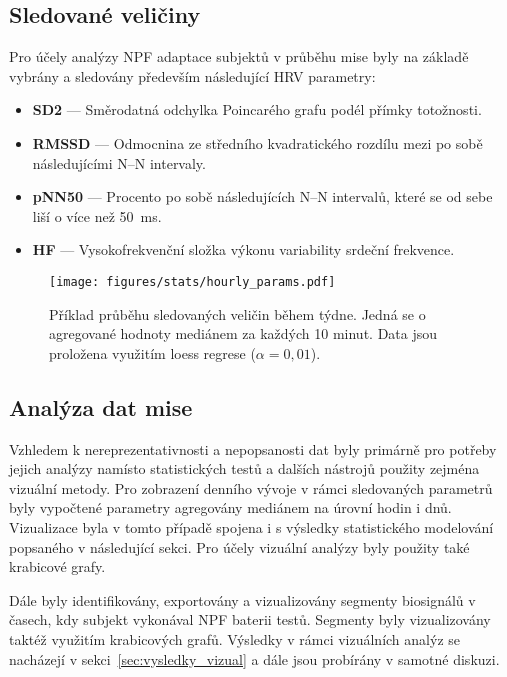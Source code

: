 \subsection{Sledované veličiny}
\label{subsec:sledovane_veliciny}
Pro účely analýzy \gls{NPF} adaptace subjektů v průběhu mise byly na
základě~\cite{Pereira2017,Shaffer2017} vybrány a sledovány především následující
\gls{HRV} parametry:
\begin{itemize}
      \item \textbf{SD2} --- Směrodatná odchylka Poincarého grafu podél přímky
      totožnosti.
      \item \textbf{RMSSD} --- Odmocnina ze středního kvadratického rozdílu mezi
            po sobě následujícími N--N intervaly.
      \item \textbf{pNN50} --- Procento po sobě následujících N--N intervalů,
            které se od sebe liší o více než 50~ms.
      \item \textbf{HF} --- Vysokofrekvenční složka výkonu variability srdeční
            frekvence.
\end{itemize}

\begin{figure}[H]
      \begin{center}
            \texttt{[image: figures/stats/hourly\_params.pdf]}
            \caption{Příklad průběhu sledovaných veličin během týdne. Jedná se o
             agregované hodnoty mediánem za každých 10 minut. Data jsou
             proložena využitím loess regrese ($\alpha = 0,01$).}
            \label{fig:params_example}
      \end{center}
\end{figure}

\subsection{Analýza dat mise}
\label{subsec:analyza_diana}
Vzhledem k nereprezentativnosti a nepopsanosti dat byly primárně pro potřeby
jejich analýzy namísto statistických testů a dalších nástrojů použity zejména
vizuální metody. Pro zobrazení denního vývoje v rámci sledovaných parametrů byly
vypočtené parametry agregovány mediánem na úrovní hodin i dnů. Vizualizace byla
v tomto případě spojena i s výsledky statistického modelování popsaného v
následující sekci. Pro účely vizuální analýzy byly použity také krabicové grafy.

Dále byly identifikovány, exportovány a vizualizovány segmenty biosignálů v
časech, kdy subjekt vykonával \gls{NPF} baterii testů. Segmenty byly
vizualizovány taktéž využitím krabicových grafů. Výsledky v rámci vizuálních
analýz se nacházejí v sekci~\ref{sec:vysledky_vizual} a dále jsou probírány v
samotné diskuzi.

